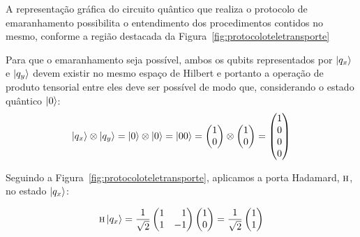A representação gráfica do circuito quântico que realiza o protocolo de emaranhamento possibilita o entendimento dos procedimentos contidos no mesmo, conforme a região destacada da Figura~\ref{fig:protocoloteletransporte}

Para que o emaranhamento seja possível, ambos os qubits representados por $\ket{q_x}$ e $\ket{q_y}$ devem existir no mesmo espaço de Hilbert e portanto a operação de produto tensorial entre eles deve ser possível de modo que, considerando o estado quântico $\ket{0}$:
\begin{equation}
\ket{q_x} \otimes \ket{q_y} = \ket{0} \otimes \ket{0} = \ket{00} = \begin{pmatrix}
1 \\
0
\end{pmatrix} \otimes \begin{pmatrix}
1 \\
0
\end{pmatrix} = \begin{pmatrix}
1 \\
0 \\
0 \\
0
\end{pmatrix}
\end{equation}

Seguindo a Figura~\ref{fig:protocoloteletransporte}, aplicamos a porta Hadamard, \(\operatorname{\textsc{h}}\), no estado $\ket{q_x}$:

\begin{equation}
\HAD \ket{q_x}= \frac{1}{\sqrt{2}} \begin{pmatrix*}[r]
1 & 1 \\
1 & -1
\end{pmatrix*} \begin{pmatrix}
1  \\
0 
\end{pmatrix} = \frac{1}{\sqrt{2}} \begin{pmatrix*}[r]
1 \\
1
\end{pmatrix*}
\end{equation}


